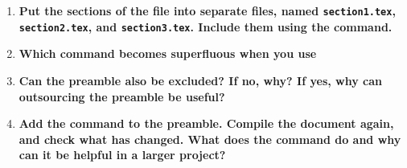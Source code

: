 \begin{enumerate}
  \item \textbf{Put the sections of the file into separate files, named 
  \texttt{section1.tex}, \texttt{section2.tex}, and \texttt{section3.tex}. 
  Include them using the  \texttt{} command.}
  \item \textbf{Which command becomes superfluous when you use 
  \texttt{}}
  \item \textbf{Can the preamble also be excluded? If no, why? If yes, why can 
  outsourcing the preamble be useful?}
  \item \textbf{Add the command \texttt{} to 
  the 
  preamble. Compile the document again, and check what has changed. What does 
  the command do and why can it be helpful in a larger project? }
\end{enumerate}
